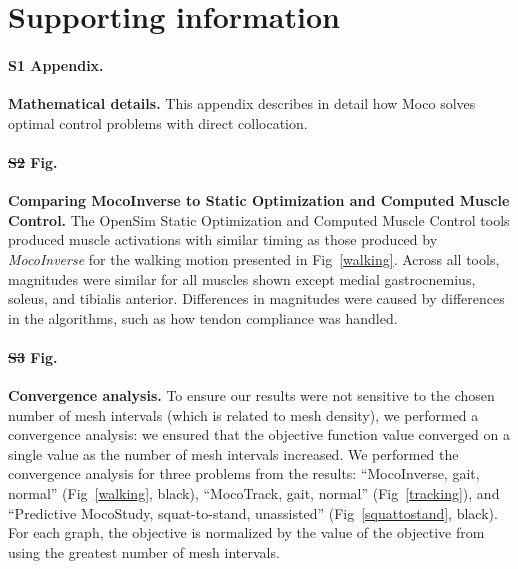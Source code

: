 \documentclass[10pt,letterpaper]{article}
\providecommand{\DIFaddtex}[1]{{\protect\color{blue}\uwave{#1}}} %
\providecommand{\DIFdeltex}[1]{{\protect\color{red}\sout{#1}}}                      %
\providecommand{\DIFaddbegin}{} %
\providecommand{\DIFaddend}{} %
\providecommand{\DIFdelbegin}{} %
\providecommand{\DIFdelend}{} %
\providecommand{\DIFadd}[1]{\texorpdfstring{\DIFaddtex{#1}}{#1}} %
\providecommand{\DIFdel}[1]{\texorpdfstring{\DIFdeltex{#1}}{}} %
\newcommand{\DIFscaledelfig}{0.5}
\newlength{\DIFdelgraphicswidth} %
\newlength{\DIFdelgraphicsheight} %
\newcommand{\DIFaddincludegraphics}[2][]{{\color{blue}\fbox{\DIFOincludegraphics[#1]{#2}}}} %
\newcommand{\DIFdelincludegraphics}[2][]{%
\sbox{\DIFdelgraphicsbox}{\DIFOincludegraphics[#1]{#2}}%
\settoboxwidth{\DIFdelgraphicswidth}{\DIFdelgraphicsbox} %
\settoboxtotalheight{\DIFdelgraphicsheight}{\DIFdelgraphicsbox} %
\scalebox{\DIFscaledelfig}{%
\parbox[b]{\DIFdelgraphicswidth}{\usebox{\DIFdelgraphicsbox}\\[-\baselineskip] \rule{\DIFdelgraphicswidth}{0em}}\llap{\resizebox{\DIFdelgraphicswidth}{\DIFdelgraphicsheight}{%
\setlength{\unitlength}{\DIFdelgraphicswidth}%
\begin{picture}(1,1)%
\thicklines\linethickness{2pt} %
{\color[rgb]{1,0,0}\put(0,0){\framebox(1,1){}}}%
{\color[rgb]{1,0,0}\put(0,0){\line( 1,1){1}}}%
{\color[rgb]{1,0,0}\put(0,1){\line(1,-1){1}}}%
\end{picture}%
}\hspace*{3pt}}} %
} %
\DeclareRobustCommand{\DIFaddbegin}{\DIFOaddbegin \let\includegraphics\DIFaddincludegraphics} %
\DeclareRobustCommand{\DIFaddend}{\DIFOaddend \let\includegraphics\DIFOincludegraphics} %
\DeclareRobustCommand{\DIFdelbegin}{\DIFOdelbegin \let\includegraphics\DIFdelincludegraphics} %
\DeclareRobustCommand{\DIFdelend}{\DIFOaddend \let\includegraphics\DIFOincludegraphics} %
\begin{document}
\DIFaddend \section*{Supporting information}

\paragraph*{S1 Appendix.}
\label{S1_Appendix}
{\bf Mathematical details.} This appendix describes in detail how Moco solves optimal control problems with direct collocation.

\paragraph*{\DIFdelbegin \DIFdel{S2 }\DIFdelend \DIFaddbegin \DIFadd{S1 }\DIFaddend Fig.}
\DIFdelbegin %
\DIFdelend \DIFaddbegin \label{S1_Fig}
\DIFaddend {\bf Comparing MocoInverse to Static Optimization and Computed Muscle Control.} The OpenSim Static Optimization and Computed Muscle Control tools produced muscle activations with similar timing as those produced by \textit{MocoInverse} for the walking motion presented in Fig~\ref{walking}. Across all tools, magnitudes were similar for all muscles shown except medial gastrocnemius, soleus, and tibialis anterior. Differences in magnitudes were caused by differences in the algorithms, such as how tendon compliance was handled.

\paragraph*{\DIFdelbegin \DIFdel{S3 }\DIFdelend \DIFaddbegin \DIFadd{S2 }\DIFaddend Fig.}
\DIFdelbegin %
\DIFdelend \DIFaddbegin \label{S2_Fig}
\DIFaddend {\bf Convergence analysis.}
To ensure our results were not sensitive to the chosen number of mesh intervals (which is related to mesh density), we performed a convergence analysis: we ensured that the objective function value converged on a single value as the number of mesh intervals increased. We performed the convergence analysis for three problems from the results: ``MocoInverse, gait, normal'' (Fig~\ref{walking}, black), ``MocoTrack, gait, normal'' (Fig~\ref{tracking}), and ``Predictive MocoStudy, squat-to-stand, unassisted'' (Fig~\ref{squattostand}, black). For each graph, the objective is normalized by the value of the objective from using the greatest number of mesh intervals.
\DIFdelbegin %
\end{document}
